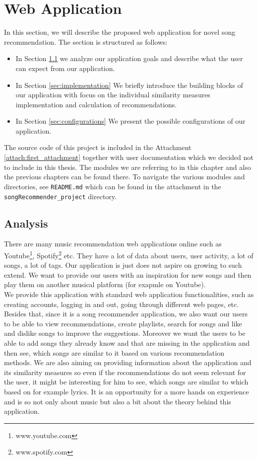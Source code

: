 \chapter{Web Application}\label{chap:web_app}

In this section, we will describe the proposed web application for novel song recommendation. The section is structured as follows: 
\begin{itemize}
    \item In Section \ref{sec:analysis} we analyze our application goals and describe what the user can expect from our application.
    \item In Section \ref{sec:implementation} We briefly introduce the building blocks of our application with focus on the individual similarity measures implementation and calculation of recommendations.
    \item In Section \ref{sec:configurations} We present the possible configurations of our application.
\end{itemize}

 The source code of this project is included in the Attachment \ref{attach:first_attachment} together with user documentation which we decided not to include in this thesis. The modules we are referring to in this chapter and also the previous chapters can be found there. To navigate the various modules and directories, see \texttt{README.md} which can be found in the attachment in the \texttt{songRecommender\_project} directory.

\section{Analysis}\label{sec:analysis}

There are many music recommendation web applications online such as Youtube\footnote{www.youtube.com}, Spotify\footnote{www.spotify.com} etc. They have a lot of data about users, user activity, a lot of songs, a lot of tags. Our application is just does not aspire on growing to such extend. We want to provide our users with an inspiration for new songs and then play them on another musical platform (for exapmle on Youtube). \\
We provide this application with standard web application functionalities, such as creating accounts, logging in and out, going through different web pages, etc. Besides that, since it is a song recommender application, we also want our users to be able to view recommendations, create playlists, search for songs and like and dislike songs to improve the suggestions. Moreover we want the users to be able to add songs they already know and that are missing in the application and then see, which songs are similar to it based on various recommendation methods. We are also aiming on providing information about the application and its similarity measures so even if the recommendations do not seem relevant for the user, it might be interesting for him to see, which songs are similar to which based on for example lyrics. It is an opportunity for a more hands on experience and is so not only about music but also a bit about the theory behind this application. \\

